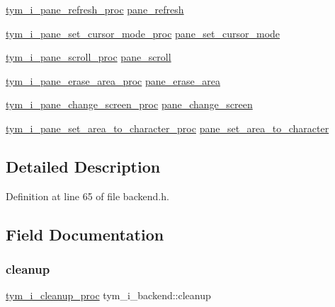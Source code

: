 \begin{DoxyCompactItemize}
\item 
\hyperlink{backend_8h_a99b50ea4d7c5349b4df1e879b2140a97}{tym\+\_\+i\+\_\+pane\+\_\+refresh\+\_\+proc} \hyperlink{structtym__i__backend_af190f73df64b296e3af5dfea90e560b4}{pane\+\_\+refresh}
\item 
\hyperlink{backend_8h_a9488390b6c0e8e6ee6df0f65c0600033}{tym\+\_\+i\+\_\+pane\+\_\+set\+\_\+cursor\+\_\+mode\+\_\+proc} \hyperlink{structtym__i__backend_abc77f840a378d769e117033440faa961}{pane\+\_\+set\+\_\+cursor\+\_\+mode}
\item 
\hyperlink{backend_8h_ab44bedb286c42c2994bf88375e64176f}{tym\+\_\+i\+\_\+pane\+\_\+scroll\+\_\+proc} \hyperlink{structtym__i__backend_aa1f08a3ae4b68a6b987c928a091ff80f}{pane\+\_\+scroll}
\item 
\hyperlink{backend_8h_a61a3d2bde17cca99666001e082332bc4}{tym\+\_\+i\+\_\+pane\+\_\+erase\+\_\+area\+\_\+proc} \hyperlink{structtym__i__backend_a81be791bdd6da6b01bb8f85b8388707c}{pane\+\_\+erase\+\_\+area}
\item 
\hyperlink{backend_8h_a069b99db5129d301726cec915fea32a8}{tym\+\_\+i\+\_\+pane\+\_\+change\+\_\+screen\+\_\+proc} \hyperlink{structtym__i__backend_a75f72684565b37e6ca66f5f71260931b}{pane\+\_\+change\+\_\+screen}
\item 
\hyperlink{backend_8h_aaaee2104d442c8976abfd9228375c878}{tym\+\_\+i\+\_\+pane\+\_\+set\+\_\+area\+\_\+to\+\_\+character\+\_\+proc} \hyperlink{structtym__i__backend_ab943a3203b09c330b09fa8c9a50b7cbf}{pane\+\_\+set\+\_\+area\+\_\+to\+\_\+character}
\end{DoxyCompactItemize}


\subsection{Detailed Description}


Definition at line 65 of file backend.\+h.



\subsection{Field Documentation}
\mbox{\label{structtym__i__backend_af3dd909e074449e20489addd04a9409b}} 
\subsubsection{\texorpdfstring{cleanup}{cleanup}}
{\footnotesize\ttfamily \hyperlink{backend_8h_a71c0f80d2ad6f4c617855bed5f727832}{tym\+\_\+i\+\_\+cleanup\+\_\+proc} tym\+\_\+i\+\_\+backend\+::cleanup}



